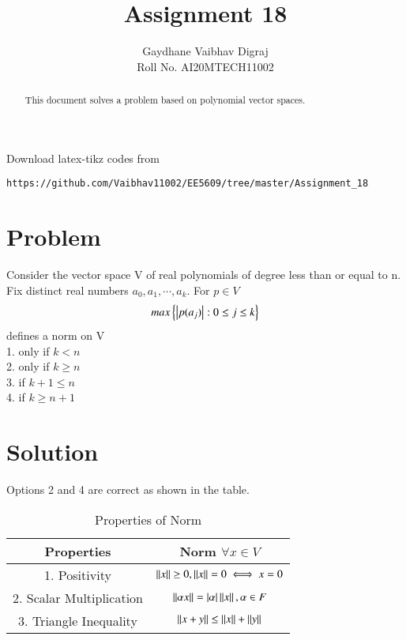 \documentclass[journal,12pt,twocolumn]{IEEEtran}
\begin{document}
     \def\rightbox#1{\makebox[0in][r]{#1}}
     \def\centbox#1{\makebox[0in]{#1}}
     \def\topbox#1{\raisebox{-\baselineskip}[0in][0in]{#1}}
     \def\midbox#1{\raisebox{-0.5\baselineskip}[0in][0in]{#1}}
\vspace{3cm}
\title{Assignment 18}
\author{Gaydhane Vaibhav Digraj \\ Roll No. AI20MTECH11002}
\maketitle
\newpage
\bigskip
\renewcommand{\thefigure}{\theenumi}
\renewcommand{\thetable}{\theenumi}
\begin{abstract}
This document solves a problem based on polynomial vector spaces.
\end{abstract}
%
Download latex-tikz codes from 
%
\begin{lstlisting}
https://github.com/Vaibhav11002/EE5609/tree/master/Assignment_18
\end{lstlisting}
%
\section{Problem}
Consider the vector space V of real polynomials of degree less than or equal to n. Fix distinct real numbers $a_0, a_1, \cdots, a_k$. For $p \in V$
\begin{align*}
    max\left\{\left\vert p(a_j)\right\vert: 0\leq j \leq k\right\}
\end{align*}
defines a norm on V \\
    1. only if $k<n$ \\
    2. only if $k\ge n$\\
    3. if $ k+1\leq n$ \\
    4. if $k \ge n+1$ \\

\section{Solution}
Options 2 and 4 are correct as shown in the table.
\begin{table*}[ht!]
\begin{center}
\begin{tabular}{|c|c|}
\hline
\textbf{Properties}&\textbf{Norm $\forall x \in V$}\\
\hline
1. Positivity & $\left\lVert x\right\rVert\ge 0, \left\lVert x\right\rVert = 0 \iff x=0 $ \\
\hline
2. Scalar Multiplication & $\left\lVert\alpha x\right\rVert = \left\vert\alpha\right\vert\left\lVert x\right\rVert, \alpha \in F $\\
\hline
3. Triangle Inequality & $\left\lVert x+y\right\rVert \le \left\lVert x\right\rVert + \left\lVert y\right\rVert $\\
\hline
\end{tabular}
\caption{Properties of Norm}
\label{table1}
\end{center}
\end{table*}
\end{document}
